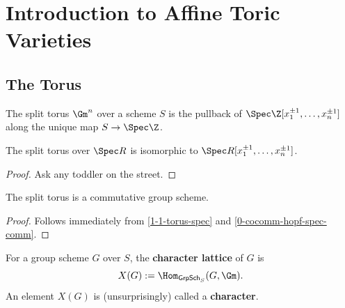 \section{Introduction to Affine Toric Varieties}


\subsection{The Torus}


\begin{definition}
  \label{1-1-torus}
  \leanok

  The split torus $\Gm^n$ over a scheme $S$ is the pullback of
  $\Spec \Z[x_1^{\pm 1}, \dotsc, x_n^{\pm 1}]$ along the unique map $S \to \Spec \Z$.
\end{definition}


\begin{lemma}
  \label{1-1-torus-spec}
  \leanok

  The split torus over $\Spec R$ is isomorphic to $\Spec R[x_1^{\pm 1}, \dotsc, x_n^{\pm 1}]$.
\end{lemma}
\begin{proof}
  \uses{}

  Ask any toddler on the street.
\end{proof}

\begin{lemma}
  \label{1-1-torus-comm}

  The split torus is a commutative group scheme.
\end{lemma}
\begin{proof}

  Follows immediately from \ref{1-1-torus-spec} and \ref{0-cocomm-hopf-spec-comm}.
\end{proof}


\begin{definition}
  \label{1-1-char}
  \leanok

  For a group scheme $G$ over $S$, the {\bf character lattice} of $G$ is
  \[
    X(G) := \Hom_{\mathsf{GrpSch}_S}(G, \Gm).
  \]
  An element $X(G)$ is (unsurprisingly) called a {\bf character}.
\end{definition}

